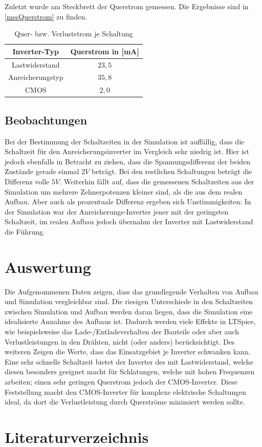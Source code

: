 \documentclass[11pt, a4paper]{article}
\begin{document}
Zuletzt wurde am Steckbrett der Querstrom gemessen. Die Ergebnisse sind in \autoref{mesQuerstrom} zu finden.
\begin{table}[h]
\centering
\begin{tabular}{c|c}
Inverter-Typ & Querstrom in [mA] \\ \hline
Lastwiderstand & $23,5$ \\
Anreicherungstyp & $35,8$ \\
CMOS & $2,0$
\end{tabular}
\caption{Quer- bzw. Verluststrom je Schaltung}
\label{mesQuerstrom}
\end{table}
\subsection*{Beobachtungen}
Bei der Bestimmung der Schaltzeiten in der Simulation ist auffällig, dass die Schaltzeit für den Anreicherungsinverter im Vergleich sehr niedrig ist. Hier ist jedoch ebenfalls in Betracht zu ziehen, dass die Spannungsdifferenz der beiden Zustände gerade einmal $2 V$ beträgt. Bei den restlichen Schaltungen beträgt die Differenz volle $5V$.
Weiterhin fällt auf, dass die gemessenen Schaltzeiten aus der Simulation um mehrere Zehnerpotenzen kleiner sind, als die aus dem realen Aufbau. Aber auch als prozentuale Differenz ergeben sich Unstimmigkeiten: In der Simulation war der Anreicherungs-Inverter jener mit der geringsten Schaltzeit, im realen Aufbau jedoch übernahm der Inverter mit Lastwiderstand die Führung.
\section*{Auswertung}
Die Aufgenommenen Daten zeigen, dass das grundlegende Verhalten von Aufbau und Simulation vergleichbar sind. Die riesigen Unterschiede in den Schaltzeiten zwischen Simulation und Aufbau werden daran liegen, dass die Simulation eine idealisierte Annahme des Aufbaus ist. Dadurch werden viele Effekte in LTSpice, wie beispielsweise das Lade-/Entladeverhalten der Bauteile oder aber auch Verlustleistungen in den Drähten, nicht (oder anders) berücksichtigt. Des weiteren Zeigen die Werte, dass das Einsatzgebiet je Inverter schwanken kann. Eine sehr schnelle Schaltzeit bietet der Inverter des mit Lastwiderstand, welche diesen besonders geeignet macht für Schlatungen, welche mit hohen Frequenzen arbeiten; einen sehr geringen Querstrom jedoch der CMOS-Inverter. Diese Feststellung macht den CMOS-Inverter für komplexe elektrische Schaltungen ideal, da dort die Verlustleistung durch Querströme minimiert werden sollte.
\section*{Literaturverzeichnis}
\end{document}
